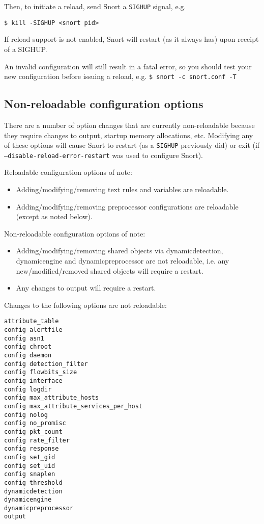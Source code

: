 \documentclass[english]{report}
\newenvironment{note}{
\samepage
    \vspace{10pt}{\textsf{
        {\hspace{7pt}\Huge{$\triangle$\hspace{-12.5pt}{\Large{$^!$}}}}\hspace{5pt}
        {\Large{NOTE}}
    }
    }
   \begin{center}
    \par\vspace{-17pt}

    \begin{lrbox}{\savepar}
    \begin{minipage}[r]{6in}
}
{
    \end{minipage}
    \end{lrbox}
    \fbox{
        \usebox{
            \savepar
	}
    }
    \par\vskip10pt
    \end{center}
}
\newenvironment{note}{
        \begin{rawhtml}
        <p><table border="1"><tr><td><b>
        Note:&nbsp;&nbsp;</b>
        \end{rawhtml}
}{
        \begin{rawhtml}
        </b></td></tr></table></p>
        \end{rawhtml}
}
\begin{document}
Then, to initiate a reload, send Snort a \texttt{SIGHUP} signal, e.g.

\begin{verbatim}
$ kill -SIGHUP <snort pid>
\end{verbatim}

\begin{note}
If reload support is not enabled, Snort will restart (as it always has)
upon receipt of a SIGHUP.
\end{note}

\begin{note}
An invalid configuration will still result in a fatal error, so
you should test your new configuration before issuing a reload, e.g.
\texttt{\$ snort -c snort.conf -T}
\end{note}


\subsection{Non-reloadable configuration options}
\label{reload:nonreloadable}
There are a number of option changes that are currently non-reloadable because
they require changes to output, startup memory allocations, etc.  Modifying any
of these options will cause Snort to restart (as a \texttt{SIGHUP} previously did) or
exit (if \texttt{--disable-reload-error-restart} was used to configure Snort).

Reloadable configuration options of note:
\begin{itemize}
\item Adding/modifying/removing text rules and variables are reloadable.
\item Adding/modifying/removing preprocessor configurations are reloadable (except
  as noted below).
\end{itemize}

Non-reloadable configuration options of note:
\begin{itemize}
\item Adding/modifying/removing shared objects via dynamicdetection, dynamicengine
  and dynamicpreprocessor are not reloadable, i.e. any new/modified/removed
  shared objects will require a restart.
\item Any changes to output will require a restart.
\end{itemize}

Changes to the following options are not reloadable:

\begin{verbatim}
attribute_table
config alertfile
config asn1
config chroot
config daemon
config detection_filter
config flowbits_size
config interface
config logdir
config max_attribute_hosts
config max_attribute_services_per_host
config nolog
config no_promisc
config pkt_count
config rate_filter
config response
config set_gid
config set_uid
config snaplen
config threshold
dynamicdetection
dynamicengine
dynamicpreprocessor
output
\end{verbatim}
\end{document}
